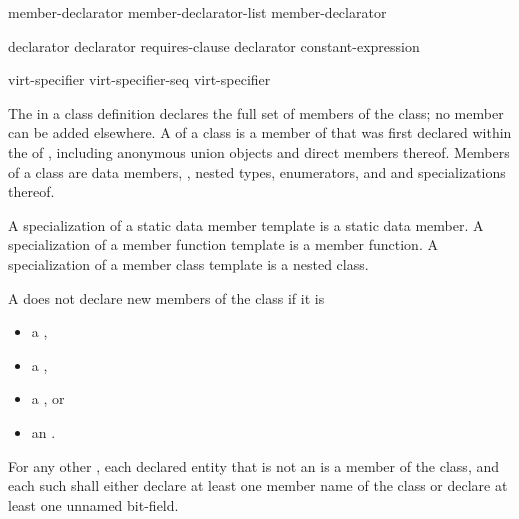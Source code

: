 \begin{bnf}
\br
    member-declarator\br
    member-declarator-list \terminal{,} member-declarator
\end{bnf}

\begin{bnf}
\br
    declarator  \br
    declarator requires-clause\br
    declarator \br
      \terminal{:} constant-expression 
\end{bnf}

\begin{bnf}
\br
    virt-specifier\br
    virt-specifier-seq virt-specifier
\end{bnf}

\begin{bnf}
\br
    \br
\end{bnf}

\begin{bnf}
\br
    \terminal{=} 
\end{bnf}

\pnum
{}%
The  in a class definition declares the
full set of members of the class; no member can be added elsewhere.
A  of a class  is a member of 
that was first declared within the  of ,
including anonymous union objects and direct members thereof.
Members of a class are data members, ,
nested types, enumerators,
and  and specializations thereof.
\begin{note}
A specialization of a static data member template is a static data member.
A specialization of a member function template is a member function.
A specialization of a member class template is a nested class.
\end{note}

\pnum
A  does not declare new members of the class
if it is
\begin{itemize}
\item a ,
\item a ,
\item a , or
\item an .
\end{itemize}
For any other ,
each declared entity
that is not an 
is a member of the class,
and each such 
shall either
declare at least one member name of the class
or declare at least one unnamed bit-field.

